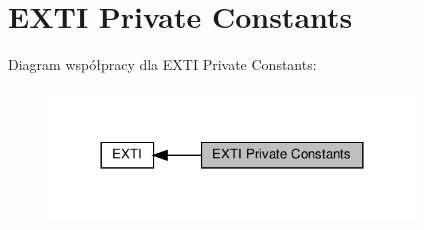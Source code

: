 \hypertarget{group___e_x_t_i___private___constants}{}\section{E\+X\+TI Private Constants}
\label{group___e_x_t_i___private___constants}
Diagram współpracy dla E\+X\+TI Private Constants\+:\nopagebreak
\begin{figure}[H]
\begin{center}
\leavevmode
\includegraphics[width=276pt]{group___e_x_t_i___private___constants}
\end{center}
\end{figure}
